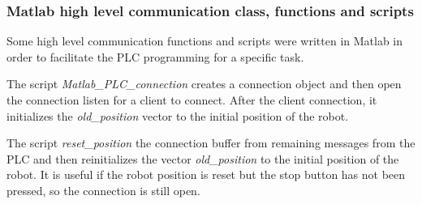 \subsubsection{Matlab high level communication class, functions and scripts}
Some high level communication functions and scripts were written in Matlab in order to facilitate the PLC programming for a specific task.

The script \textit{Matlab\_PLC\_connection} creates a connection object and then open the connection listen for a client to connect. After the client connection, it initializes the \textit{old\_position} vector to the initial position of the robot.



The script \textit{reset\_position} the connection buffer from remaining messages from the PLC and then reinitializes the vector \textit{old\_position} to the initial position of the robot. It is useful if the robot position is reset but the stop button has not been pressed, so the connection is still open.



